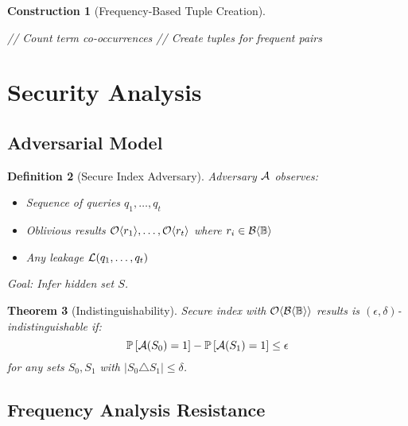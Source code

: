 \documentclass[11pt,final]{article}
\newcommand{\BernBool}{\mathcal{B}\langle \Bool \rangle}
\newtheorem{theorem}{Theorem}[section]
\newtheorem{definition}[theorem]{Definition}
\newtheorem{construction}[theorem]{Construction}
\begin{document}
\begin{construction}[Frequency-Based Tuple Creation]
\begin{algorithm}[H]
\caption{Adaptive Tuple Index Construction}
// Count term co-occurrences\;
// Create tuples for frequent pairs\;
\end{algorithm}
\end{construction}

\section{Security Analysis}

\subsection{Adversarial Model}

\begin{definition}[Secure Index Adversary]
Adversary $\mathcal{A}$ observes:
\begin{itemize}
    \item Sequence of queries $q_1, \ldots, q_t$
    \item Oblivious results $\mathcal{O}\langle r_1 \rangle, \ldots, \mathcal{O}\langle r_t \rangle$ where $r_i \in \BernBool$
    \item Any leakage $\mathcal{L}(q_1, \ldots, q_t)$
\end{itemize}
Goal: Infer hidden set $S$.
\end{definition}

\begin{theorem}[Indistinguishability]
Secure index with $\Obv{\BernBool}$ results is $(\epsilon, \delta)$-indistinguishable if:
\begin{equation}
\mathbb{P}\left[\mathcal{A}(S_0) = 1\right] - \mathbb{P}\left[\mathcal{A}(S_1) = 1\right] \leq \epsilon
\end{equation}
for any sets $S_0, S_1$ with $|S_0 \triangle S_1| \leq \delta$.
\end{theorem}

\subsection{Frequency Analysis Resistance}
\end{document}
